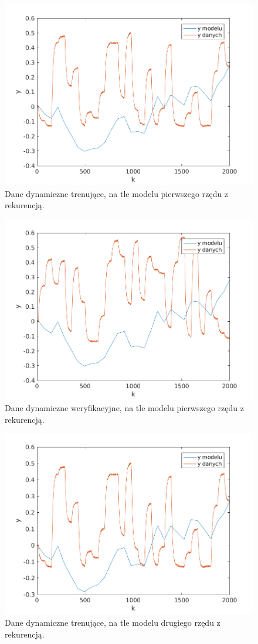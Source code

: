 \documentclass{article}
\begin{document}
\begin{figure}
	\centering
	\includegraphics[width=0.7\linewidth]{../dane_dynamiczne/model_rek_train_1}
	\caption{Dane dynamiczne trenujące, na tle modelu pierwszego rzędu z rekurencją.}
	\label{fig:model_rek_train_1}
\end{figure}

\begin{figure}
	\centering
	\includegraphics[width=0.7\linewidth]{../dane_dynamiczne/model_rek_walid_1}
	\caption{Dane dynamiczne weryfikacyjne, na tle modelu pierwszego rzędu z rekurencją.}
	\label{fig:model_rek_walid_1}
\end{figure}

\begin{figure}
	\centering
	\includegraphics[width=0.7\linewidth]{../dane_dynamiczne/model_rek_train_2}
	\caption{Dane dynamiczne trenujące, na tle modelu drugiego rzędu z rekurencją.}
	\label{fig:model_rek_train_2}
\end{figure}
\end{document}

